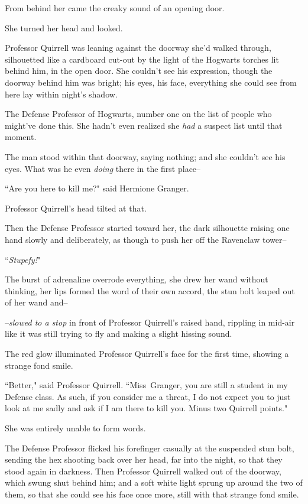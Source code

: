 From behind her came the creaky sound of an opening door.

She turned her head and looked.

Professor Quirrell was leaning against the doorway she'd walked through, silhouetted like a cardboard cut-out by the light of the Hogwarts torches lit behind him, in the open door. She couldn't see his expression, though the doorway behind him was bright; his eyes, his face, everything she could see from here lay within night's shadow.

The Defense Professor of Hogwarts, number one on the list of people who might've done this. She hadn't even realized she \emph{had} a suspect list until that moment.

The man stood within that doorway, saying nothing; and she couldn't see his eyes. What was he even \emph{doing} there in the first place\---

``Are you here to kill me?" said Hermione Granger.

Professor Quirrell's head tilted at that.

Then the Defense Professor started toward her, the dark silhouette raising one hand slowly and deliberately, as though to push her off the Ravenclaw tower\---

``\emph{Stupefy!}"

The burst of adrenaline overrode everything, she drew her wand without thinking, her lips formed the word of their own accord, the stun bolt leaped out of her wand and\---

\---\emph{slowed to a stop} in front of Professor Quirrell's raised hand, rippling in mid-air like it was still trying to fly and making a slight hissing sound.

The red glow illuminated Professor Quirrell's face for the first time, showing a strange fond smile.

``Better," said Professor Quirrell. ``Miss~Granger, you are still a student in my Defense class. As such, if you consider me a threat, I do not expect you to just look at me sadly and ask if I am there to kill you. Minus two Quirrell points."

She was entirely unable to form words.

The Defense Professor flicked his forefinger casually at the suspended stun bolt, sending the hex shooting back over her head, far into the night, so that they stood again in darkness. Then Professor Quirrell walked out of the doorway, which swung shut behind him; and a soft white light sprung up around the two of them, so that she could see his face once more, still with that strange fond smile.

